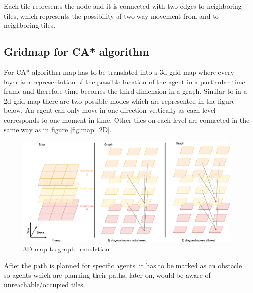 Each tile represents the node and it is connected with two edges to neighboring tiles, which represents the possibility of two-way movement from and to neighboring tiles. 


\subsection{Gridmap for CA* algorithm}
For CA* algorithm map has to be translated into a 3d grid map where every layer is a representation of the possible location of the agent in a particular time frame and therefore time becomes the third dimension in a graph. Similar to in a 2d grid map there are two possible modes which are represented in the figure below. An agent can only move in one direction vertically as each level corresponds to one moment in time. Other tiles on each level are connected in the same way as in figure \ref{fig:map_2D}.
\begin{figure}[H]
    \centering
    \includegraphics[width=\textwidth]{pictures/map_3D.png}
    \caption{ 3D map to graph translation }
    \label{fig:map_3D}
\end{figure}
After the path is planned for specific agents, it has to be marked as an obstacle so agents which are planning their paths, later on, would be aware of unreachable/occupied tiles.

